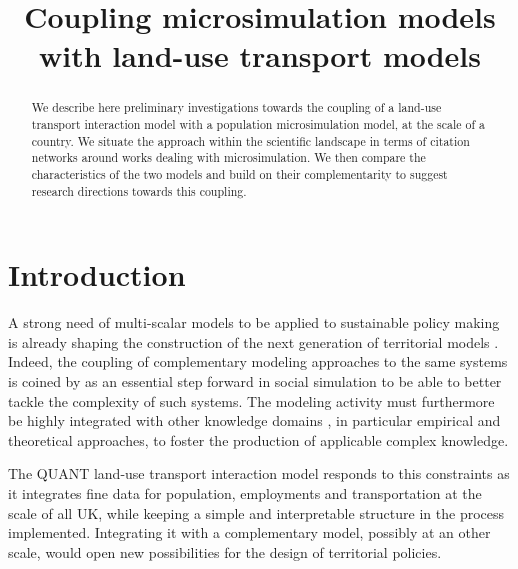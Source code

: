 


\title{Coupling microsimulation models with land-use transport models}

\date{}

\maketitle

\justify


\begin{abstract}
	We describe here preliminary investigations towards the coupling of a land-use transport interaction model with a population microsimulation model, at the scale of a country. We situate the approach within the scientific landscape in terms of citation networks around works dealing with microsimulation. We then compare the characteristics of the two models and build on their complementarity to suggest research directions towards this coupling. 
\end{abstract}




\section{Introduction}


A strong need of multi-scalar models to be applied to sustainable policy making is already shaping the construction of the next generation of territorial models \cite{Rozenblat2018}. Indeed, the coupling of complementary modeling approaches to the same systems is coined by \cite{banos2013pour} as an essential step forward in social simulation to be able to better tackle the complexity of such systems. The modeling activity must furthermore be highly integrated with other knowledge domains \cite{raimbault2017applied}, in particular empirical and theoretical approaches, to foster the production of applicable complex knowledge.

The QUANT land-use transport interaction model \cite{batty2019generalized} responds to this constraints as it integrates fine data for population, employments and transportation at the scale of all UK, while keeping a simple and interpretable structure in the process implemented. Integrating it with a complementary model, possibly at an other scale, would open new possibilities for the design of territorial policies.

